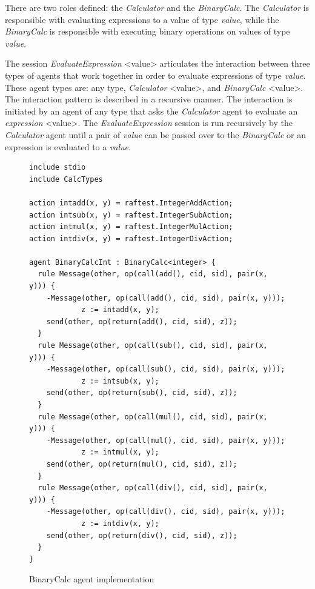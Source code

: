 \documentclass[a4paper,12pt,oneside,fleqn]{book} %
\begin{document}
There are two roles defined: the \textit{Calculator} and the
\textit{BinaryCalc}. The \textit{Calculator} is responsible with evaluating
expressions to a value of type \textit{value}, while the
\textit{BinaryCalc} is responsible with executing binary operations on
values of type \textit{value}.

The session \textit{EvaluateExpression} <value> articulates the interaction
between three types of agents that work together in order to evaluate
expressions of type \textit{value}. These agent types are: any type,
\textit{Calculator} <value>, and \textit{BinaryCalc} <value>. The
interaction pattern is described in a recursive manner. The interaction is
initiated by an agent of any type that asks the \textit{Calculator} agent
to evaluate an \textit{expression} <value>. The \textit{EvaluateExpression}
session is run recursively by the \textit{Calculator} agent until a pair of
\textit{value} can be passed over to the \textit{BinaryCalc} or an
expression is evaluated to a \textit{value}.

\begin{figure}\footnotesize %
\begin{verbatim}
include stdio
include CalcTypes

action intadd(x, y) = raftest.IntegerAddAction;
action intsub(x, y) = raftest.IntegerSubAction;
action intmul(x, y) = raftest.IntegerMulAction;
action intdiv(x, y) = raftest.IntegerDivAction;

agent BinaryCalcInt : BinaryCalc<integer> {
  rule Message(other, op(call(add(), cid, sid), pair(x, y))) {
    -Message(other, op(call(add(), cid, sid), pair(x, y)));
            z := intadd(x, y);
    send(other, op(return(add(), cid, sid), z));
  }
  rule Message(other, op(call(sub(), cid, sid), pair(x, y))) {
    -Message(other, op(call(sub(), cid, sid), pair(x, y)));
            z := intsub(x, y);
    send(other, op(return(sub(), cid, sid), z));
  }
  rule Message(other, op(call(mul(), cid, sid), pair(x, y))) {
    -Message(other, op(call(mul(), cid, sid), pair(x, y)));
            z := intmul(x, y);
    send(other, op(return(mul(), cid, sid), z));
  }
  rule Message(other, op(call(div(), cid, sid), pair(x, y))) {
    -Message(other, op(call(div(), cid, sid), pair(x, y)));
            z := intdiv(x, y);
    send(other, op(return(div(), cid, sid), z));
  }
}
\end{verbatim}
\caption{BinaryCalc agent implementation}
\label{fig:bcalc-rules}
\end{figure} %
\end{document}
